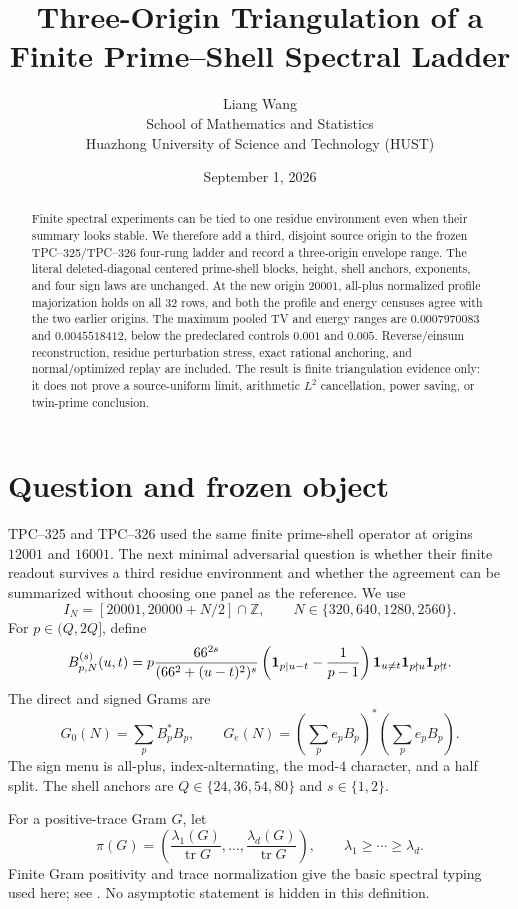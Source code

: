 \documentclass[10pt]{article}
\title{Three-Origin Triangulation of a Finite Prime--Shell Spectral Ladder}
\author{Liang Wang\\School of Mathematics and Statistics\\Huazhong University of Science and Technology (HUST)}
\date{September 1, 2026}
\begin{document}
\maketitle

\begin{abstract}
Finite spectral experiments can be tied to one residue environment even when
their summary looks stable.  We therefore add a third, disjoint source origin
to the frozen TPC--325/TPC--326 four-rung ladder and record a three-origin
envelope range.  The literal deleted-diagonal centered prime-shell blocks,
height, shell anchors, exponents, and four sign laws are unchanged.  At the
new origin $20001$, all-plus normalized profile majorization holds on all
$32$ rows, and both the profile and energy censuses agree with the two earlier
origins.  The maximum pooled TV and energy ranges are
$0.0007970083$ and $0.0045518412$, below the predeclared controls $0.001$ and
$0.005$.  Reverse/einsum reconstruction, residue perturbation stress, exact
rational anchoring, and normal/optimized replay are included.  The result is
finite triangulation evidence only: it does not prove a source-uniform limit,
arithmetic $L^2$ cancellation, power saving, or twin-prime conclusion.
\end{abstract}

\section{Question and frozen object}

TPC--325 and TPC--326 used the same finite prime-shell operator at origins
$12001$ and $16001$.  The next minimal adversarial question is whether their
finite readout survives a third residue environment and whether the agreement
can be summarized without choosing one panel as the reference.  We use
\[
 I_N=[20001,20000+N/2]\cap\mathbb Z,
 \qquad N\in\{320,640,1280,2560\}.
\]
For $p\in(Q,2Q]$, define
\begin{equation}
B_{p,N}^{(s)}(u,t)=p\frac{66^{2s}}{(66^2+(u-t)^2)^s}
\left({\bf1}_{p\mid u-t}-\frac1{p-1}\right)
{\bf1}_{u\ne t}{\bf1}_{p\nmid u}{\bf1}_{p\nmid t}.
\end{equation}
The direct and signed Grams are
\[
 G_0(N)=\sum_p B_p^*B_p,\qquad
 G_e(N)=\left(\sum_p e_pB_p\right)^*
                 \left(\sum_p e_pB_p\right).
\]
The sign menu is all-plus, index-alternating, the mod-$4$ character, and a
half split.  The shell anchors are $Q\in\{24,36,54,80\}$ and $s\in\{1,2\}$.

For a positive-trace Gram $G$, let
\[
 \pi(G)=\left(\frac{\lambda_1(G)}{\operatorname{tr}G},\ldots,
 \frac{\lambda_d(G)}{\operatorname{tr}G}\right),
 \qquad \lambda_1\geq\cdots\geq\lambda_d.
\]
Finite Gram positivity and trace normalization give the basic spectral typing
used here; see \cite{horn2013matrix}.  No asymptotic statement is hidden in
this definition.
\end{document}
